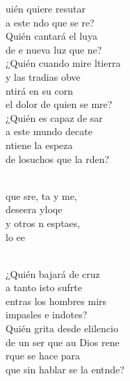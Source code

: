 \documentclass[12pt]{article}
\begin{document}
\begin{multicols*}{2}
\begin{cancion}%
	uién quiere resutar \\
	a este ndo que se re?\\
	Quién cantará el luya\\
	de e nueva luz que ne?\\
	¿Quién cuando mire ltierra \\
	y las tradias obve\\
	ntirá en su corn  \\
	el dolor de quien se mre?\\
	¿Quién es capaz de sar \\
	a este mundo decate\\
	ntiene la espeza \\
	de losuchos que la rden?\\\jump\\
	\begin{chorus}%
	que sre, ta y me, \\
	deseera yloqe\\
	y otros n esptaes, \\
	lo ee\\
	\end{chorus}%
	\jump\\
	¿Quién bajará de  cruz \\
	a tanto isto sufrte\\
	entras los hombres mirs \\
	impasles e indotes?\\
	Quién grita desde elilencio \\
	de un ser que au Dios rene\\
	rque se hace para \\
	que sin hablar se la entnde?\\

\end{cancion}
\end{multicols*}
\end{document}
